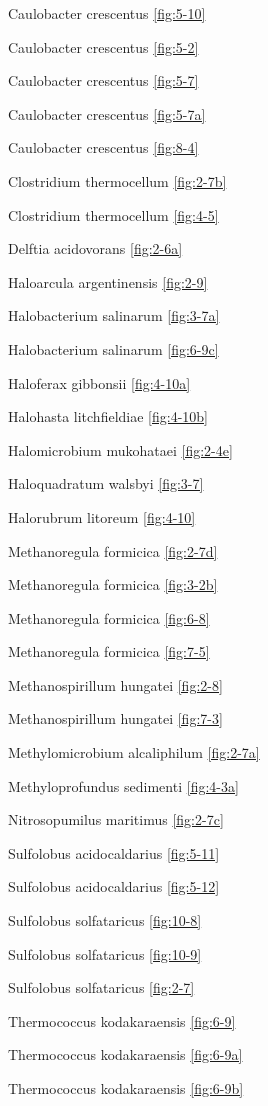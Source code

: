 \documentclass[]{tufte-book}
\begin{document}
Caulobacter crescentus \ref{fig:5-10}

Caulobacter crescentus \ref{fig:5-2}

Caulobacter crescentus \ref{fig:5-7}

Caulobacter crescentus \ref{fig:5-7a}

Caulobacter crescentus \ref{fig:8-4}

Clostridium thermocellum \ref{fig:2-7b}

Clostridium thermocellum \ref{fig:4-5}

Delftia acidovorans \ref{fig:2-6a}

Haloarcula argentinensis \ref{fig:2-9}

Halobacterium salinarum \ref{fig:3-7a}

Halobacterium salinarum \ref{fig:6-9c}

Haloferax gibbonsii \ref{fig:4-10a}

Halohasta litchfieldiae \ref{fig:4-10b}

Halomicrobium mukohataei \ref{fig:2-4e}

Haloquadratum walsbyi \ref{fig:3-7}

Halorubrum litoreum \ref{fig:4-10}

Methanoregula formicica \ref{fig:2-7d}

Methanoregula formicica \ref{fig:3-2b}

Methanoregula formicica \ref{fig:6-8}

Methanoregula formicica \ref{fig:7-5}

Methanospirillum hungatei \ref{fig:2-8}

Methanospirillum hungatei \ref{fig:7-3}

Methylomicrobium alcaliphilum \ref{fig:2-7a}

Methyloprofundus sedimenti \ref{fig:4-3a}

Nitrosopumilus maritimus \ref{fig:2-7c}

Sulfolobus acidocaldarius \ref{fig:5-11}

Sulfolobus acidocaldarius \ref{fig:5-12}

Sulfolobus solfataricus \ref{fig:10-8}

Sulfolobus solfataricus \ref{fig:10-9}

Sulfolobus solfataricus \ref{fig:2-7}

Thermococcus kodakaraensis \ref{fig:6-9}

Thermococcus kodakaraensis \ref{fig:6-9a}

Thermococcus kodakaraensis \ref{fig:6-9b}
\end{document}
